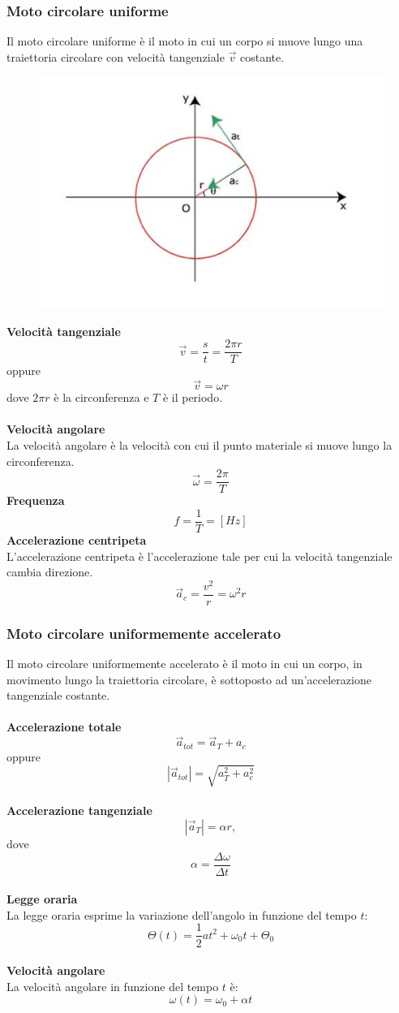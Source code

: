 \documentclass{article}
\begin{document}
\subsubsection{Moto circolare uniforme}
Il moto circolare uniforme è il moto in cui un corpo si muove lungo una traiettoria circolare con velocità tangenziale \(\Vec{v}\) costante.
\begin{figure}[ht]
    \centering
    \includegraphics[width=0.7\linewidth]{Immagini/circolare.png}
\end{figure}
\noindent\textbf{Velocità tangenziale}
\[
\Vec{v} = \frac{s}{t} = \frac{2\pi r}{T}
\]
oppure
\[
\Vec{v} = \omega r
\]
dove \(2\pi r\) è la circonferenza e \(T\) è il periodo.
\\
\\
\textbf{Velocità angolare}\\
La velocità angolare è la velocità con cui il punto materiale si muove lungo la circonferenza.
\[
    \Vec{\omega} = \frac{2 \pi}{T} 
\]
\newpage
\noindent \textbf{Frequenza}
\[
    f = \frac{1}{T} = [Hz]
\]
\textbf{Accelerazione centripeta}\\
L'accelerazione centripeta è l'accelerazione tale per cui la velocità tangenziale cambia direzione.
\[
    \Vec{a}_c = \frac{v^2}{r} = \omega^2r
\]
\subsubsection{Moto circolare uniformemente accelerato}
Il moto circolare uniformemente accelerato è il moto in cui un corpo, in movimento lungo la traiettoria circolare, è sottoposto ad un'accelerazione tangenziale costante.\\
\\
\textbf{Accelerazione totale}
\[
    \Vec{a}_{tot} = \Vec{a}_T + a_c
\]
oppure
\[
    \left|\Vec{a}_{tot}\right| = \sqrt{a_T^2 +a_c^2}
\]
\\
\textbf{Accelerazione tangenziale}
\[
    \left|\Vec{a}_{T} \right| = \alpha r,
\]
dove    
\[
    \alpha = \frac{\Delta \omega}{\Delta t}
\]
\\
\textbf{Legge oraria}\\
La legge oraria esprime la variazione dell'angolo in funzione del tempo \(t\):
\[
    \Theta(t) = \frac{1}{2}at^2 + \omega_0t + \Theta_0
\]
\\
\textbf{Velocità angolare}\\
La velocità angolare in funzione del tempo \(t\) è:
\[
    \omega(t) = \omega_0 + \alpha t
\]
\newpage
\end{document}
